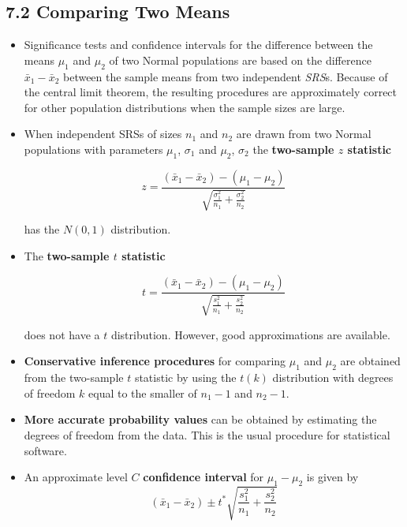 	\subsection{7.2 Comparing Two Means}
		\begin{itemize}
			 \item Significance tests and confidence intervals for the difference between the means $\mu_1$ and $\mu_2$ of two Normal populations are based on the difference $\bar{x}_1-\bar{x}_2$ between the sample means from two independent \textit{SRS}s. Because of the central limit theorem, the resulting procedures are approximately correct for other population distributions when the sample sizes are large.
			
			\item When independent SRSs of sizes $n_1$ and $n_2$ are drawn from two Normal populations with parameters $\mu_1$, $\sigma_1$ and $\mu_2$, $\sigma_2$ the \textbf{two-sample $z$ statistic}
			
			\[z=\frac{(\bar{x}_1-\bar{x}_2)-(\mu_1-\mu_2)}{\sqrt{\frac{\sigma_1^2}{n_1}+\frac{\sigma_2^2}{n_2}}}\]
			
			has the $N(0, 1)$ distribution.
			
			\item The \textbf{two-sample $t$ statistic}
			
			\[t=\frac{(\bar{x}_1-\bar{x}_2)-(\mu_1-\mu_2)}{\sqrt{\frac{s_1^2}{n_1}+\frac{s_2^2}{n_2}}}\]
			
			does not have a $t$ distribution. However, good approximations are available.
			
			\item \textbf{Conservative inference procedures} for comparing $\mu_1$ and $\mu_2$ are obtained from the two-sample $t$ statistic by using the $t(k)$ distribution with degrees of freedom $k$ equal to the smaller of $n_1-1$ and $n_2-1$.
			
			\item \textbf{More accurate probability values} can be obtained by estimating the degrees of freedom from the data. This is the usual procedure for statistical software.
			
			\item An approximate level $C$ \textbf{confidence interval} for $\mu_1-\mu_2$ is given by
			\[(\bar{x}_1-\bar{x}_2)\pm t^{*}\sqrt{ \frac{s_1^2}{n_1}+\frac{s_2^2}{n_2} } \]
			

\end{itemize}
